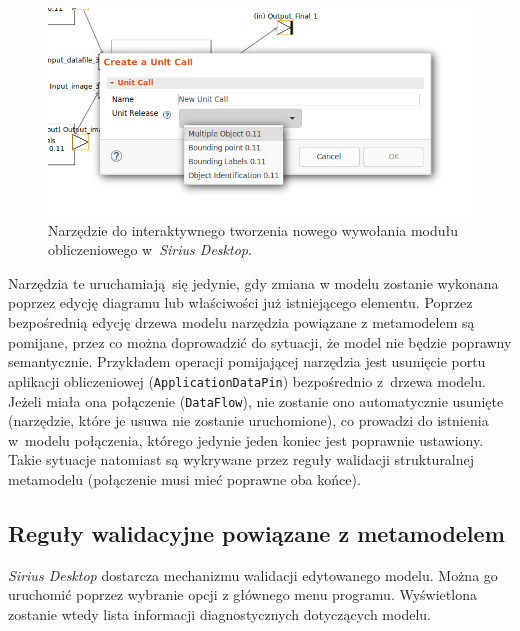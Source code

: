 \begin{figure}[!hb]
	\centering

	\includegraphics[width=0.95\linewidth]{./images/sirius-desktop-create-unit-call-tool.png}
	\caption{Narzędzie do interaktywnego tworzenia nowego wywołania modułu
		obliczeniowego w~\emph{Sirius Desktop}.}\label{rys:sirius-desktop-create-unit-call-tool}
\end{figure}

Narzędzia te uruchamiają się jedynie, gdy zmiana w modelu zostanie wykonana
poprzez edycję diagramu lub właściwości już istniejącego elementu. Poprzez
bezpośrednią edycję drzewa modelu narzędzia powiązane z metamodelem są
pomijane, przez co można doprowadzić do sytuacji, że model nie będzie poprawny
semantycznie. Przykładem operacji pomijającej narzędzia jest usunięcie portu
aplikacji obliczeniowej (\texttt{ApplicationDataPin}) bezpośrednio z~drzewa
modelu. Jeżeli miała ona połączenie (\texttt{DataFlow}), nie zostanie ono
automatycznie usunięte (narzędzie, które je usuwa nie zostanie uruchomione), co
prowadzi do istnienia w~modelu połączenia, którego jedynie jeden koniec jest
poprawnie ustawiony. Takie sytuacje natomiast są wykrywane przez reguły
walidacji strukturalnej metamodelu (połączenie musi mieć poprawne oba końce).

\subsection{Reguły walidacyjne powiązane z
	metamodelem}\label{sec:reguly-walidacyjne-metamodel}

\emph{Sirius Desktop} dostarcza mechanizmu walidacji edytowanego modelu. Można
go uruchomić poprzez wybranie opcji  z głównego menu
programu. Wyświetlona zostanie wtedy lista informacji diagnostycznych
dotyczących modelu.

